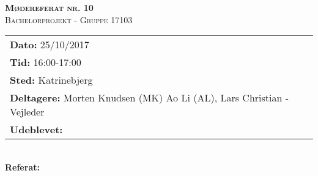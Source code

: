 
\newcommand{\HRule}{\rule{\linewidth}{0.1mm}}


	\begin{center}
		{\huge \bfseries \textsc{Mødereferat nr. 10}}\\
		\textsc{\large Bachelorprojekt - Gruppe 17103}\\[0.3cm]
	\end{center}
	\begin{tabular}{ll}
	\large \textbf{Dato:} 25/10/2017  	\\ %
	\large \textbf{Tid:}  16:00-17:00 	\\ %
	\large \textbf{Sted:} Katrinebjerg		\\ %
	\large \textbf{Deltagere:} Morten Knudsen (MK) Ao Li (AL), Lars Christian - Vejleder \\
	\large \textbf{Udeblevet:} 
	\end{tabular}\\
	\phantom{\,}\hspace{0.1em} \large \textbf{Referat:}
